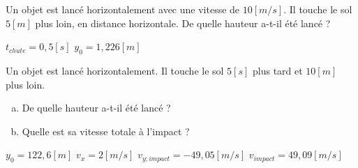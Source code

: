 \begin{exercise}
    Un objet est lancé horizontalement avec une vitesse de \(10[m/s]\). Il touche le sol \(5[m]\) plus loin, en distance horizontale. De quelle hauteur a-t-il été lancé ?
\end{exercise}
\begin{solution}
    \(t_{chute}=0,5[s]\)
    \(y_0=1,226[m]\)
\end{solution}

\begin{exercise}
    Un objet est lancé horizontalement. Il touche le sol \(5[s]\) plus tard et \(10[m]\) plus loin.
    \begin{enumerate}[a)]
        \item De quelle hauteur a-t-il été lancé ?
        \item Quelle est sa vitesse totale à l'impact ?
    \end{enumerate}
\end{exercise}
\begin{solution}
    \(y_0=122,6[m]\)
    \(v_x=2[m/s]\)
    \(v_{y;impact}=-49,05[m/s]\)
    \(v_{impact}=49,09[m/s]\)
\end{solution}
